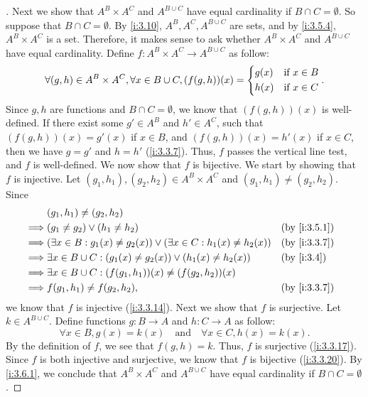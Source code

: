 \begin{proof}[]
  Next we show that \(A^B \times A^C\) and \(A^{B \cup C}\) have equal cardinality if \(B \cap C = \emptyset\).
  So suppose that \(B \cap C = \emptyset\).
  By \cref{i:3.10}, \(A^B, A^C, A^{B \cup C}\) are sets, and by \cref{i:3.5.4}, \(A^B \times A^C\) is a set.
  Therefore, it makes sense to ask whether \(A^B \times A^C\) and \(A^{B \cup C}\) have equal cardinality.
  Define \(f : A^B \times A^C \to A^{B \cup C}\) as follow:
  \[
    \forall (g, h) \in A^B \times A^C, \forall x \in B \cup C, (f(g, h))(x) = \begin{dcases}
      g(x) & \text{if } x \in B \\
      h(x) & \text{if } x \in C
    \end{dcases}.
  \]
  Since \(g, h\) are functions and \(B \cap C = \emptyset\), we know that \((f(g, h))(x)\) is well-defined.
  If there exist some \(g' \in A^B\) and \(h' \in A^C\), such that \((f(g, h))(x) = g'(x)\) if \(x \in B\), and \((f(g, h))(x) = h'(x)\) if \(x \in C\), then we have \(g = g'\) and \(h = h'\) (\cref{i:3.3.7}).
  Thus, \(f\) passes the vertical line test, and \(f\) is well-defined.
  We now show that \(f\) is bijective.
  We start by showing that \(f\) is injective.
  Let \((g_1, h_1), (g_2, h_2) \in A^B \times A^C\) and \((g_1, h_1) \neq (g_2, h_2)\).
  Since
  \begin{align*}
             & (g_1, h_1) \neq (g_2, h_2)                                                                           \\
    \implies & (g_1 \neq g_2) \lor (h_1 \neq h_2)                                                 &  & \by{i:3.5.1} \\
    \implies & (\exists x \in B : g_1(x) \neq g_2(x)) \lor (\exists x \in C : h_1(x) \neq h_2(x)) &  & \by{i:3.3.7} \\
    \implies & \exists x \in B \cup C : (g_1(x) \neq g_2(x)) \lor (h_1(x) \neq h_2(x))            &  & \by{i:3.4}   \\
    \implies & \exists x \in B \cup C : (f(g_1, h_1))(x) \neq (f(g_2, h_2))(x)                                      \\
    \implies & f(g_1, h_1) \neq f(g_2, h_2),                                                      &  & \by{i:3.3.7}
  \end{align*}
  we know that \(f\) is injective (\cref{i:3.3.14}).
  Next we show that \(f\) is surjective.
  Let \(k \in A^{B \cup C}\).
  Define functions \(g : B \to A\) and \(h : C \to A\) as follow:
  \[
    \forall x \in B, g(x) = k(x) \quad \text{and} \quad \forall x \in C, h(x) = k(x).
  \]
  By the definition of \(f\), we see that \(f(g, h) = k\).
  Thus, \(f\) is surjective (\cref{i:3.3.17}).
  Since \(f\) is both injective and surjective, we know that \(f\) is bijective (\cref{i:3.3.20}).
  By \cref{i:3.6.1}, we conclude that \(A^B \times A^C\) and \(A^{B \cup C}\) have equal cardinality if \(B \cap C = \emptyset\).


\end{proof}
